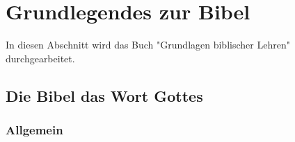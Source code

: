 \section{Grundlegendes zur Bibel}
In diesen Abschnitt wird das Buch "Grundlagen biblischer Lehren" durchgearbeitet. 
\subsection{Die Bibel das Wort Gottes}
\subsubsection{Allgemein}


